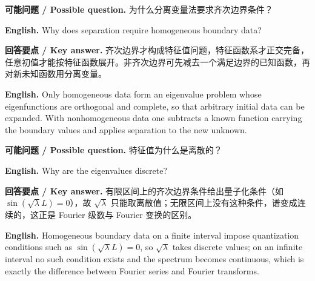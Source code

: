 \documentclass[UTF8,11pt,a4paper]{ctexart}
\newcommand{\EN}[1]{\par\noindent \textbf{English.} #1\par}
\newcommand{\ASK}[4]{\par\noindent \textbf{可能问题 / Possible question.} #1\par\EN{#2}\noindent \textbf{回答要点 / Key answer.} #3\par\EN{#4}\medskip}
\begin{document}
\ASK{为什么分离变量法要求齐次边界条件？}{Why does separation require homogeneous boundary data?}{齐次边界才构成特征值问题，特征函数系才正交完备，任意初值才能按特征函数展开。非齐次边界可先减去一个满足边界的已知函数，再对新未知函数用分离变量。}{Only homogeneous data form an eigenvalue problem whose eigenfunctions are orthogonal and complete, so that arbitrary initial data can be expanded. With nonhomogeneous data one subtracts a known function carrying the boundary values and applies separation to the new unknown.}
\ASK{特征值为什么是离散的？}{Why are the eigenvalues discrete?}{有限区间上的齐次边界条件给出量子化条件（如 $\sin(\sqrt\lambda L)=0$），故 $\sqrt\lambda$ 只能取离散值；无限区间上没有这种条件，谱变成连续的，这正是 Fourier 级数与 Fourier 变换的区别。}{Homogeneous boundary data on a finite interval impose quantization conditions such as $\sin(\sqrt\lambda L)=0$, so $\sqrt\lambda$ takes discrete values; on an infinite interval no such condition exists and the spectrum becomes continuous, which is exactly the difference between Fourier series and Fourier transforms.}
\end{document}
